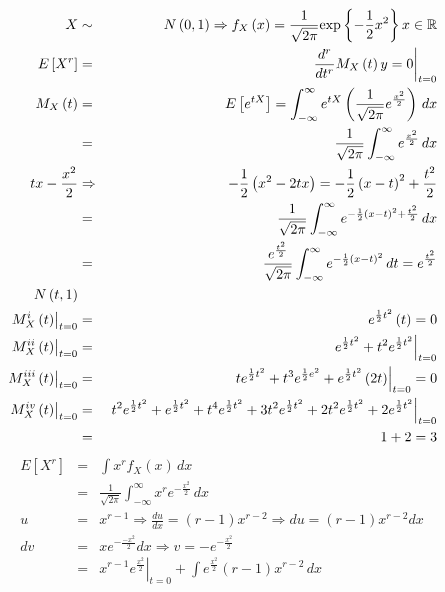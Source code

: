 \begin{enumerate}
\begin{eqnarray*}
X &\sim & N \left(0,1 \right) \Rightarrow f_{X}\left(x \right)= \frac{1}{\sqrt{2\pi}} \textrm{exp} \left\{- \frac{1}{2}x^2 \right\} x\in \mathbb{R} \\
E \left[ X^{r} \right] &=& \left.\frac{d^{r} } {dt^{r}} M_{X}\left( t \right) {y=0} \right|_{t=0}\\
M_{X} \left(t \right) &=& E \left[e^{tX} \right] = \int_{-\infty }^{\infty} e^{tX}\left(\frac{1}{\sqrt{2\pi}}e^{\frac{x^{2} }{2}} \right) \, dx\\
&=& \frac{1}{\sqrt{2\pi}}\int_{-\infty }^{ \infty } e^{\frac{x^{2} }{2}}\, dx \\
tx- \frac{x^{2}}{2} & \Rightarrow & - \frac{1}{2}\left(x^{2}- 2tx  \right)= - \frac{1}{2} \left(x-t \right)^{2}+ \frac{t^{2}}{2}\\
&=&\frac{1}{\sqrt{2\pi}} \int_{-\infty}^{\infty} e^{- \frac{1}{2}\left(x-t \right)^2+ \frac{t^2}{2} }\,dx\\
&=&\frac{e^{\frac{t^2}{2}}}{\sqrt{2\pi}} \int_{-\infty}^{\infty} e^{- \frac{1}{2}\left(x-t \right)^2 }\,dt = e^{\frac{t^2}{2}}\\
N \left(t,1 \right)\\
\left. M^{i}_{X}\left(t \right)\right|_{t=0} &=& e^{\frac{1}{2}t^2}\left(t \right)=0\\
\left. M^{ii}_{X}\left(t \right)\right|_{t=0} &=&\left. e^{\frac{1}{2}t^2}+ t^2e^{\frac{1}{2}t^2}\right|_{t=0}\\
\left. M^{iii}_{X}\left(t \right)\right|_{t=0} &=& \left. te^{\frac{1}{2}t^2}+ t^3e^{\frac{1}{2}e^2}+ e^{\frac{1}{2}t^2}\left( 2t \right)\right|_{t=0} =0\\
\left. M^{iv}_{X}\left(t \right)\right|_{t=0} &=& \left. t^2e^{\frac{1}{2}t^2} + e^{ \frac{1}{2}t^2} + t^4 e^{\frac{1}{2}t^2 }+3 t^2 e^{\frac{1}{2}t^2 }+ 2t^2e^{\frac{1}{2}t^2}+ 2e^{\frac{1}{2}t^2 } \right|_{t=0}\\
&=& 1+2=3
\end{eqnarray*} 
\begin{eqnarray*}
E \left[X^r \right] &=&  \int x^r f_{X}\left(x \right)\, dx\\
&=& \frac{1}{\sqrt{2\pi}} \int_{-\infty}^{\infty}x^r e^{- \frac{x^2}{2} }\, dx\\
u &=& x^{r-1} \Rightarrow \frac{du}{dx}= \left(r-1 \right)x^{r-2} \Rightarrow du= \left( r-1 \right)x^{r-2} dx\\
dv &=& xe^{-\frac{-x^2}{2}} dx \Rightarrow v= - e^{-\frac{x^2}{2}}\\
&=& \left. x^{r-1} e^{\frac{x^2}{2}}\right|_{t=0} + \int e^{\frac{x^2 }{2}} \left(r-1 \right)x^{r-2}\, dx\\

\end{eqnarray*}
\end{enumerate}
